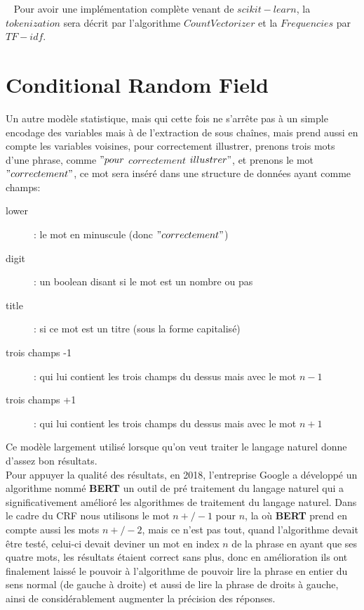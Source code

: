 \ \linebreak
Pour avoir une implémentation complète venant de $scikit-learn$, la $tokenization$ sera décrit par l'algorithme $CountVectorizer$ et la $Frequencies$ par $TF-idf$.\\
\pagebreak

\section{Conditional Random Field}
Un autre modèle statistique, mais qui cette fois ne s'arrête pas à un simple encodage des variables mais à de l'extraction de sous chaînes, mais prend aussi en compte les variables voisines, pour correctement illustrer, prenons trois mots d'une phrase, comme $"pour$ $correctement$ $illustrer"$, et prenons le mot $"correctement"$, ce mot sera inséré dans une structure de données ayant comme champs:
\begin{description}
\item[lower]: le mot en minuscule (donc $"correctement"$)
\item[digit]: un boolean disant si le mot est un nombre ou pas
\item[title]: si ce mot est un titre (sous la forme capitalisé)
\item[trois champs -1]: qui lui contient les trois champs du dessus mais avec le mot $n-1$ 
\item[trois champs +1]: qui lui contient les trois champs du dessus mais avec le mot $n+1$ 
\end{description}

Ce modèle largement utilisé lorsque qu'on veut traiter le langage naturel donne d'assez bon résultats.\\
\linebreak
Pour appuyer la qualité des résultats, en 2018, l'entreprise Google a développé un algorithme nommé \textbf{BERT} un outil de pré traitement du langage naturel qui a significativement amélioré les algorithmes de traitement du langage naturel. Dans le cadre du CRF nous utilisons le mot $n+/-1$ pour $n$, la où \textbf{BERT} prend en compte aussi les mots $n+/-2$, mais ce n'est pas tout, quand l'algorithme devait être testé, celui-ci devait deviner un mot en index $n$ de la phrase en ayant que ses quatre mots, les résultats étaient correct sans plus, donc en amélioration ils ont finalement laissé le pouvoir à l'algorithme de pouvoir lire la phrase en entier du sens normal (de gauche à droite) et aussi de lire la phrase de droits à gauche, ainsi de considérablement augmenter la précision des réponses.

